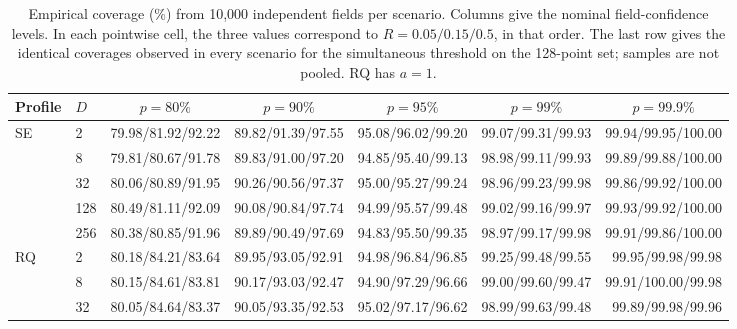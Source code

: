 \begin{table}[pos=htbp]
\centering\small
\setlength{\tabcolsep}{2.1pt}
\renewcommand{\arraystretch}{1.08}
\setlength{\aboverulesep}{0pt}
\setlength{\belowrulesep}{0pt}
\setlength{\extrarowheight}{1pt}
\caption{Empirical coverage (\%) from 10,000 independent fields per
scenario. Columns give the nominal field-confidence levels. In each
pointwise cell, the three values correspond to $R=0.05/0.15/0.5$,
in that order. The last row gives the identical coverages observed
in every scenario for the simultaneous threshold on the 128-point
set; samples are not pooled. RQ has $a=1$.}
\label{tab:empirical-calibration}
\begin{tabular}{@{}l|l|rrrrr@{}}
\toprule
Profile & $D$ & \multicolumn{1}{c}{$p=80\%$} & \multicolumn{1}{c}{$p=90\%$} & \multicolumn{1}{c}{$p=95\%$} & \multicolumn{1}{c}{$p=99\%$} & \multicolumn{1}{c}{$p=99.9\%$} \\
\midrule
SE & 2 & 79.98/81.92/92.22 & 89.82/91.39/97.55 & 95.08/96.02/99.20 & \phantom{0}99.07/\phantom{0}99.31/\phantom{0}99.93 & \phantom{0}99.94/\phantom{0}99.95/100.00 \\
 & 8 & 79.81/80.67/91.78 & 89.83/91.00/97.20 & 94.85/95.40/99.13 & \phantom{0}98.98/\phantom{0}99.11/\phantom{0}99.93 & \phantom{0}99.89/\phantom{0}99.88/100.00 \\
 & 32 & 80.06/80.89/91.95 & 90.26/90.56/97.37 & 95.00/95.27/99.24 & \phantom{0}98.96/\phantom{0}99.23/\phantom{0}99.98 & \phantom{0}99.86/\phantom{0}99.92/100.00 \\
 & 128 & 80.49/81.11/92.09 & 90.08/90.84/97.74 & 94.99/95.57/99.48 & \phantom{0}99.02/\phantom{0}99.16/\phantom{0}99.97 & \phantom{0}99.93/\phantom{0}99.92/100.00 \\
 & 256 & 80.38/80.85/91.96 & 89.89/90.49/97.69 & 94.83/95.50/99.35 & \phantom{0}98.97/\phantom{0}99.17/\phantom{0}99.98 & \phantom{0}99.91/\phantom{0}99.86/100.00 \\[3pt]
RQ & 2 & 80.18/84.21/83.64 & 89.95/93.05/92.91 & 94.98/96.84/96.85 & \phantom{0}99.25/\phantom{0}99.48/\phantom{0}99.55 & \phantom{0}99.95/\phantom{0}99.98/\phantom{0}99.98 \\
 & 8 & 80.15/84.61/83.81 & 90.17/93.03/92.47 & 94.90/97.29/96.66 & \phantom{0}99.00/\phantom{0}99.60/\phantom{0}99.47 & \phantom{0}99.91/100.00/\phantom{0}99.98 \\
 & 32 & 80.05/84.64/83.37 & 90.05/93.35/92.53 & 95.02/97.17/96.62 & \phantom{0}98.99/\phantom{0}99.63/\phantom{0}99.48 & \phantom{0}99.89/\phantom{0}99.98/\phantom{0}99.96 \\

\end{tabular}
\end{table}
